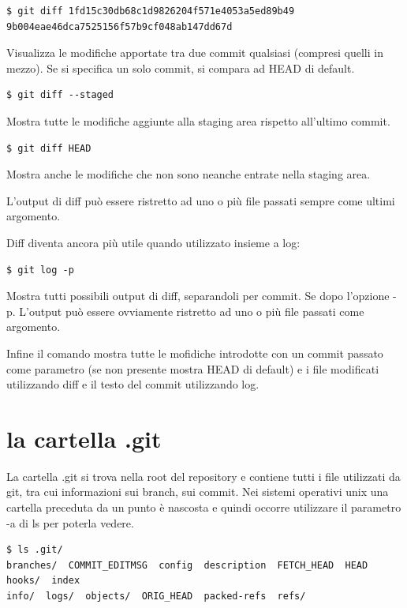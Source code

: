 \documentclass{article}
\begin{document}
\begin{verbatim}
$ git diff 1fd15c30db68c1d9826204f571e4053a5ed89b49 9b004eae46dca7525156f57b9cf048ab147dd67d
\end{verbatim}

Visualizza le modifiche apportate tra due commit qualsiasi (compresi
quelli in mezzo).
Se si specifica un solo commit, si compara ad HEAD di default.

\begin{verbatim}
$ git diff --staged
\end{verbatim}

Mostra tutte le modifiche aggiunte alla staging area rispetto all'ultimo commit.

\begin{verbatim}
$ git diff HEAD
\end{verbatim}

Mostra anche le modifiche che non sono neanche entrate nella staging area.

L'output di diff può essere ristretto ad uno o più file passati sempre come
ultimi argomento.

Diff diventa ancora più utile quando utilizzato insieme a log:

\begin{verbatim}
$ git log -p
\end{verbatim}

Mostra tutti possibili output di diff, separandoli per commit. Se dopo l'opzione
-p. L'output può essere ovviamente ristretto ad uno o più file passati come
argomento.

Infine il comando  mostra tutte le mofidiche introdotte con un
commit passato come parametro (se non presente mostra HEAD di default) e i file
modificati utilizzando diff e il testo del commit utilizzando log.

\section{la cartella .git}
La cartella .git si trova nella root del repository e contiene tutti i file
utilizzati da git, tra cui informazioni sui branch, sui commit. Nei sistemi
operativi unix una cartella preceduta da un punto è nascosta e quindi occorre
utilizzare il parametro -a di ls per poterla vedere.

\begin{verbatim}
$ ls .git/
branches/  COMMIT_EDITMSG  config  description  FETCH_HEAD  HEAD  hooks/  index  
info/  logs/  objects/  ORIG_HEAD  packed-refs  refs/
\end{verbatim}
\end{document}
